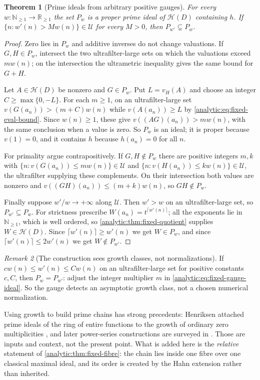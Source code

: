 \documentclass[11pt,letterpaper]{article}
\newtheorem{theorem}{Theorem}[section]
\theoremstyle{definition}
\theoremstyle{remark}
\newtheorem{remark}[theorem]{Remark}
\newcommand{\R}{\mathbb R}
\newcommand{\N}{\mathbb N}
\newcommand{\HH}{\mathcal H}
\newcommand{\UU}{\mathcal U}
\newcommand{\vH}{v_{\!H}}
\numberwithin{equation}{section}
\begin{document}
\begin{theorem}[Prime ideals from arbitrary positive gauges]
\label{analytic:thm:fixed-gauge-prime}
For every $w:\N_{\ge1}\to\R_{\ge1}$ the set $P_w$ is a proper prime ideal
of $\HH(D)$ containing $h$. If $\{n:w'(n)>Mw(n)\}\in\UU$ for every $M>0$,
then $P_{w'}\subsetneq P_w$.
\end{theorem}
\begin{proof}
Zero lies in $P_w$ and additive inverses do not change valuations. If
$G,H\in P_w$, intersect the two ultrafilter-large sets on which the
valuations exceed $mw(n)$; on the intersection the ultrametric inequality
gives the same bound for $G+H$.

Let $A\in\HH(D)$ be nonzero and $G\in P_w$. Put $L=\vH(A)$ and choose an
integer $C\ge\max\{0,-L\}$. For each $m\ge1$, on an ultrafilter-large set
$v(G(a_n))>(m+C)w(n)$ while $v(A(a_n))\ge L$ by
\eqref{analytic:eq:fixed-eval-bound}. Since $w(n)\ge1$, these give
$v((AG)(a_n))>mw(n)$, with the same conclusion when a value is zero. So
$P_w$ is an ideal; it is proper because $v(1)=0$, and it contains $h$
because $h(a_n)=0$ for all $n$.

For primality argue contrapositively. If $G,H\notin P_w$ there are
positive integers $m,k$ with $\{n:v(G(a_n))\le mw(n)\}\in\UU$ and
$\{n:v(H(a_n))\le kw(n)\}\in\UU$, the ultrafilter supplying these
complements. On their intersection both values are nonzero and
$v((GH)(a_n))\le(m+k)w(n)$, so $GH\notin P_w$.

Finally suppose $w'/w\to+\infty$ along $\UU$. Then $w'>w$ on an
ultrafilter-large set, so $P_{w'}\subseteq P_w$. For strictness prescribe
$W(a_n)=t^{\lceil w'(n)\rceil}$; all the exponents lie in $\N_{\ge1}$,
which is well ordered, so \cref{analytic:thm:fixed-quotient} supplies
$W\in\HH(D)$. Since $\lceil w'(n)\rceil\ge w'(n)$ we get $W\in P_w$, and
since $\lceil w'(n)\rceil\le2w'(n)$ we get $W\notin P_{w'}$.
\end{proof}

\begin{remark}[The construction sees growth classes, not normalizations]
\label{analytic:rem:fixed-growth-class}
If $cw(n)\le w'(n)\le Cw(n)$ on an ultrafilter-large set for positive
constants $c,C$, then $P_w=P_{w'}$: adjust the integer multiplier $m$ in
\eqref{analytic:eq:fixed-gauge-ideal}. So the gauge detects an asymptotic
growth class, not a chosen numerical normalization.
\end{remark}

Using growth to build prime chains has strong precedents: Henriksen
attached prime ideals of the ring of entire functions to the growth of
ordinary zero multiplicities \cite{Henriksen53}, and later power-series
constructions are surveyed in \cite{KangToan}. Those are inputs and
context, not the present point. What is added here is the \emph{relative}
statement of \cref{analytic:thm:fixed-fibre}: the chain lies inside one
fibre over one classical maximal ideal, and its order is created by the
Hahn extension rather than inherited.
\end{document}
